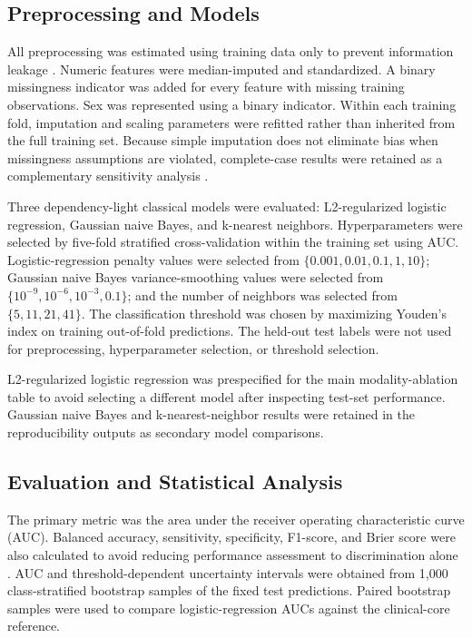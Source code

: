 \documentclass[preprint,12pt]{elsarticle}
\begin{document}
\subsection{Preprocessing and Models}

All preprocessing was estimated using training data only to prevent information leakage \cite{varoquauxMachineLearningMedical2022}. Numeric features were median-imputed and standardized. A binary missingness indicator was added for every feature with missing training observations. Sex was represented using a binary indicator. Within each training fold, imputation and scaling parameters were refitted rather than inherited from the full training set. Because simple imputation does not eliminate bias when missingness assumptions are violated, complete-case results were retained as a complementary sensitivity analysis \cite{Janssen2010,austinMissingDataClinical2021}.

Three dependency-light classical models were evaluated: L2-regularized logistic regression, Gaussian naive Bayes, and k-nearest neighbors. Hyperparameters were selected by five-fold stratified cross-validation within the training set using AUC. Logistic-regression penalty values were selected from $\{0.001,0.01,0.1,1,10\}$; Gaussian naive Bayes variance-smoothing values were selected from $\{10^{-9},10^{-6},10^{-3},0.1\}$; and the number of neighbors was selected from $\{5,11,21,41\}$. The classification threshold was chosen by maximizing Youden's index on training out-of-fold predictions. The held-out test labels were not used for preprocessing, hyperparameter selection, or threshold selection.

L2-regularized logistic regression was prespecified for the main modality-ablation table to avoid selecting a different model after inspecting test-set performance. Gaussian naive Bayes and k-nearest-neighbor results were retained in the reproducibility outputs as secondary model comparisons.

\subsection{Evaluation and Statistical Analysis}

The primary metric was the area under the receiver operating characteristic curve (AUC). Balanced accuracy, sensitivity, specificity, F1-score, and Brier score were also calculated to avoid reducing performance assessment to discrimination alone \cite{steyerbergAssessingPerformancePrediction2010,vancalsterCalibrationAchillesHeel2019}. AUC and threshold-dependent uncertainty intervals were obtained from 1,000 class-stratified bootstrap samples of the fixed test predictions. Paired bootstrap samples were used to compare logistic-regression AUCs against the clinical-core reference.
\end{document}
